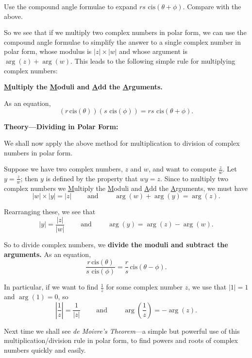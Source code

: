\documentclass{article}
\newcommand{\cis}{\,\mathrm{cis}}
\begin{document}
\vfill



Use the compound angle formulae to expand $rs\,\cis(\theta+\phi)$. Compare with the above.

\vfill


So we see that if we multiply two complex numbers in polar form, we can use the compound angle formulae to simplify the answer to a single complex number in polar form, whose modulus is $|z|\times |w|$ and whose argument is $\arg(z)+\arg(w)$. This leads to the following simple rule for multiplying complex numbers:

\begin{center}
\textbf{\underline{M}ultiply the \underline{M}oduli and \underline{A}dd the \underline{A}rguments.}
\end{center}

As an equation,
\[(r\cis(\theta))(s\,\cis(\phi))=rs\,\cis(\theta+\phi).\]



\clearpage


\textbf{Theory---Dividing in Polar Form:}

We shall now apply the above method for multiplication to division of complex numbers in polar form.

Suppose we have two complex numbers, $z$ and $w$, and want to compute $\frac{z}{w}$. Let $y=\frac{z}{w}$; then $y$ is defined by the property that $wy=z$. Since to multiply two complex numbers we \underline{M}ultiply the \underline{M}oduli and \underline{A}dd the \underline{A}rguments, we must have
\[|w|\times |y|=|z|\qquad\mbox{ and }\qquad \arg(w)+\arg(y)=\arg(z).\]

Rearranging these, we see that
\[|y|=\frac{|z|}{|w|}\qquad\mbox{ and }\qquad \arg(y)=\arg(z)-\arg(w).\]

So to divide complex numbers, we \textbf{divide the moduli and subtract the arguments.} As an equation,
\[\frac{r\cis(\theta)}{s\,\cis(\phi)}=\frac{r}{s}\cis(\theta-\phi).\]


In particular, if we want to find $\frac{1}{z}$ for some complex number $z$, we use that $|1|=1$ and $\arg(1)=0$, so
\[\left|\frac{1}{z}\right|=\frac{1}{|z|}\qquad\mbox{ and }\qquad \arg\left(\frac{1}{z}\right)=-\arg(z).\]

\vspace{5mm}

Next time we shall see \textit{de Moivre's Theorem}---a simple but powerful use of this multiplication/division rule in polar form, to find powers and roots of complex numbers quickly and easily.
\end{document}
